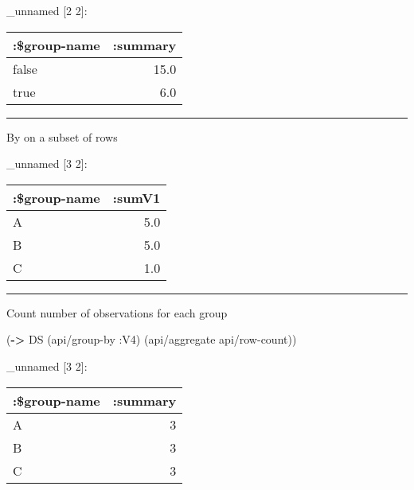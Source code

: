\documentclass[]{article}
\newenvironment{Shaded}{\begin{snugshade}}{\end{snugshade}}
\newcommand{\KeywordTok}[1]{\textcolor[rgb]{0.13,0.29,0.53}{\textbf{#1}}}
\newcommand{\DecValTok}[1]{\textcolor[rgb]{0.00,0.00,0.81}{#1}}
\newcommand{\VariableTok}[1]{\textcolor[rgb]{0.00,0.00,0.00}{#1}}
\newcommand{\AttributeTok}[1]{\textcolor[rgb]{0.77,0.63,0.00}{#1}}
\newcommand{\NormalTok}[1]{#1}
\begin{document}
\_unnamed {[}2 2{]}:

\begin{longtable}[]{@{}lr@{}}
\toprule
:\$group-name & :summary\tabularnewline
\midrule
\endhead
false & 15.0\tabularnewline
true & 6.0\tabularnewline
\bottomrule
\end{longtable}

\begin{center}\rule{0.5\linewidth}{0.5pt}\end{center}

By on a subset of rows

\begin{Shaded}
\end{Shaded}

\_unnamed {[}3 2{]}:

\begin{longtable}[]{@{}lr@{}}
\toprule
:\$group-name & :sumV1\tabularnewline
\midrule
\endhead
A & 5.0\tabularnewline
B & 5.0\tabularnewline
C & 1.0\tabularnewline
\bottomrule
\end{longtable}

\begin{center}\rule{0.5\linewidth}{0.5pt}\end{center}

Count number of observations for each group

\begin{Shaded}
\begin{Highlighting}[]
\NormalTok{(}\KeywordTok{->}\NormalTok{ DS}
\NormalTok{    (api/group-by }\AttributeTok{:V4}\NormalTok{)}
\NormalTok{    (api/aggregate api/row-count))}
\end{Highlighting}
\end{Shaded}

\_unnamed {[}3 2{]}:

\begin{longtable}[]{@{}lr@{}}
\toprule
:\$group-name & :summary\tabularnewline
\midrule
\endhead
A & 3\tabularnewline
B & 3\tabularnewline
C & 3\tabularnewline
\bottomrule
\end{longtable}
\end{document}

